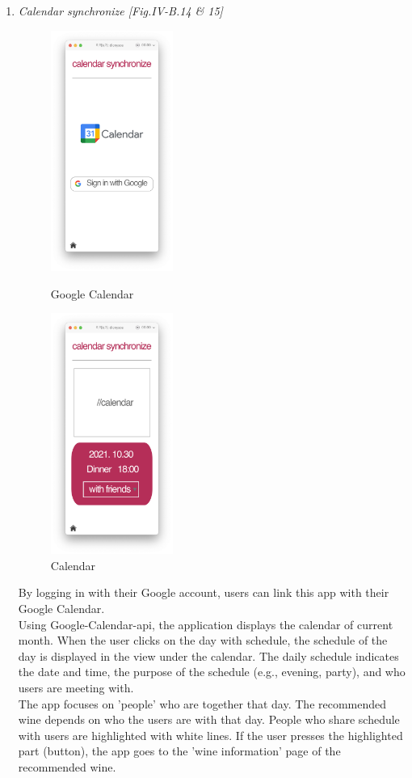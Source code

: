 \documentclass[conference]{IEEEtran}
\numberwithin{figure}{subsection}
\begin{document}
\begin{enumerate}
\begin{enumerate}
\begin{enumerate}
            \item \textit{Calendar synchronize [Fig.IV-B.14 \& 15]}\\
            \begin{figure}[htb!]
                \centerline{\includegraphics[width=4cm]{calendar.png}}
                \caption{Google Calendar}
                \centerline{\includegraphics[width=4cm]{calendar2.png}}
                \caption{Calendar}
            \end{figure}
            By logging in with their Google account, users can link this app with their Google Calendar.\\
            Using Google-Calendar-api, the application displays the calendar of current month. When the user clicks on the day with schedule, the schedule of the day is displayed in the view under the calendar. The daily schedule indicates the date and time, the purpose of the schedule (e.g., evening, party), and who users are meeting with.\\
            The app focuses on 'people' who are together that day. The recommended wine depends on who the users are with that day. People who share schedule with users are highlighted with white lines. If the user presses the highlighted part (button), the app goes to the 'wine information' page of the recommended wine.\\
        \end{enumerate}
        

\end{enumerate}
\end{enumerate}
\end{document}
